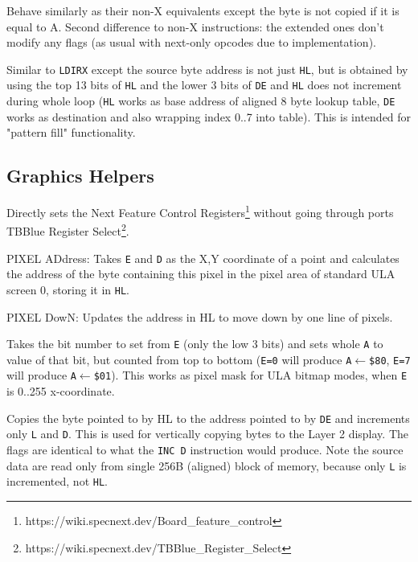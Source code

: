 \documentclass[oneside,a4paper]{book}
\begin{document}
\begin{description}
	

	Behave similarly as their non-X equivalents except the byte is not copied if it is equal to A. Second difference to non-X instructions: the extended ones don't modify any flags (as usual with next-only opcodes due to implementation).


	Similar to {\tt LDIRX} except the source byte address is not just {\tt HL}, but is obtained by using the top 13 bits of {\tt HL} and the lower 3 bits of {\tt DE} and {\tt HL} does not increment during whole loop ({\tt HL} works as base address of aligned 8 byte lookup table, {\tt DE} works as destination and also wrapping index 0..7 into table). This is intended for "pattern fill" functionality.
	
\end{description}

\subsection{Graphics Helpers}

\begin{description}


	Directly sets the Next Feature Control Registers\footnote{https://wiki.specnext.dev/Board\_feature\_control} without going through ports TBBlue Register Select\footnote{https://wiki.specnext.dev/TBBlue\_Register\_Select}.


	PIXEL ADdress: Takes {\tt E} and {\tt D} as the X,Y coordinate of a point and calculates the address of the byte containing this pixel in the pixel area of standard ULA screen 0, storing it in {\tt HL}.


	PIXEL DowN: Updates the address in HL to move down by one line of pixels.


	Takes the bit number to set from {\tt E} (only the low 3 bits) and sets whole {\tt A} to value of that bit, but counted from top to bottom ({\tt E=0} will produce {\tt A$\leftarrow$\$80}, {\tt E=7} will produce {\tt A$\leftarrow$\$01}). This works as pixel mask for ULA bitmap modes, when {\tt E} is 0..255 x-coordinate.
		

	Copies the byte pointed to by HL to the address pointed to by {\tt DE} and increments only {\tt L} and {\tt D}. This is used for vertically copying bytes to the Layer 2 display. The flags are identical to what the {\tt INC D} instruction would produce. Note the source data are read only from single 256B (aligned) block of memory, because only {\tt L} is incremented, not {\tt HL}.

\end{description}
\end{document}
